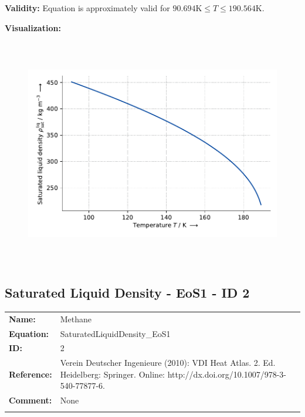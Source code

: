 \textbf{Validity:}
\newline
Equation is approximately valid for $90.694 \si{\kelvin} \leq T \leq 190.564 \si{\kelvin}$.
\newline

\textbf{Visualization:}
%
\begin{figure}[!htp]
{\noindent\includegraphics[height=10cm, keepaspectratio]{figs/ref/ref_Methane_SaturatedLiquidDensity_EoS1_1.pdf}}
\end{figure}
%

\FloatBarrier
\newpage
\subsection{Saturated Liquid Density - EoS1 - ID 2}
%
\begin{tabular}[l]{|lp{11.5cm}|}
\hline
\addlinespace

\textbf{Name:} & Methane \\
\textbf{Equation:} & SaturatedLiquidDensity\_EoS1 \\
\textbf{ID:} & 2 \\
\textbf{Reference:} & Verein Deutscher Ingenieure (2010): VDI Heat Atlas. 2. Ed. Heidelberg: Springer. Online: http://dx.doi.org/10.1007/978-3-540-77877-6. \\
\textbf{Comment:} & None \\

\addlinespace
\hline
\end{tabular}
\newline

